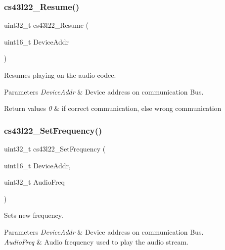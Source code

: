 \subsubsection{\texorpdfstring{cs43l22\+\_\+\+Resume()}{cs43l22\_Resume()}}
{\footnotesize\ttfamily uint32\+\_\+t cs43l22\+\_\+\+Resume (\begin{DoxyParamCaption}\item[{uint16\+\_\+t}]{Device\+Addr }\end{DoxyParamCaption})}



Resumes playing on the audio codec. 


\begin{DoxyParams}{Parameters}
{\em Device\+Addr} & Device address on communication Bus. \\
\hline
\end{DoxyParams}

\begin{DoxyRetVals}{Return values}
{\em 0} & if correct communication, else wrong communication \\
\hline
\end{DoxyRetVals}
\mbox{\label{group___c_s43_l22___private___functions_ga1ea4920e35f5e5f903870a50b53bc719}} 
\subsubsection{\texorpdfstring{cs43l22\+\_\+\+Set\+Frequency()}{cs43l22\_SetFrequency()}}
{\footnotesize\ttfamily uint32\+\_\+t cs43l22\+\_\+\+Set\+Frequency (\begin{DoxyParamCaption}\item[{uint16\+\_\+t}]{Device\+Addr,  }\item[{uint32\+\_\+t}]{Audio\+Freq }\end{DoxyParamCaption})}



Sets new frequency. 


\begin{DoxyParams}{Parameters}
{\em Device\+Addr} & Device address on communication Bus. ~\newline
\\
\hline
{\em Audio\+Freq} & Audio frequency used to play the audio stream. \\
\hline
\end{DoxyParams}

